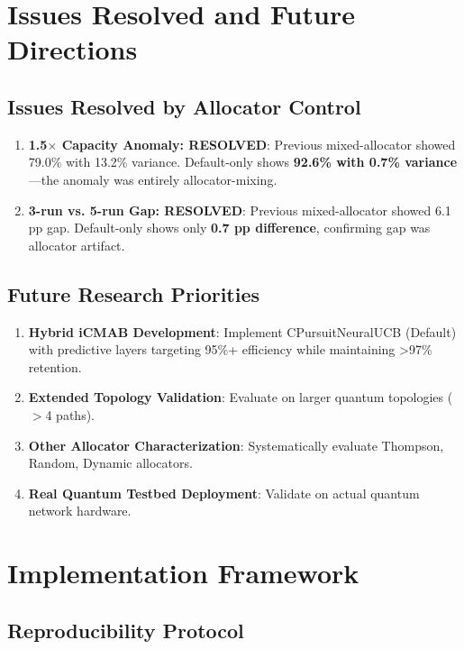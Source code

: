 \documentclass[12pt,a4paper]{article}
\newcommand{\success}[1]{\textcolor{accentgreen}{\textbf{#1}}}
\begin{document}
\section{Issues Resolved and Future Directions}

\subsection{Issues Resolved by Allocator Control}

\begin{enumerate}
    \item \success{1.5$\times$ Capacity Anomaly: RESOLVED}: Previous mixed-allocator showed 79.0\% with 13.2\% variance. Default-only shows \success{92.6\% with 0.7\% variance}—the anomaly was entirely allocator-mixing.
    
    \item \success{3-run vs. 5-run Gap: RESOLVED}: Previous mixed-allocator showed 6.1 pp gap. Default-only shows only \success{0.7 pp difference}, confirming gap was allocator artifact.
\end{enumerate}

\subsection{Future Research Priorities}

\begin{enumerate}
    \item \textbf{Hybrid iCMAB Development}: Implement CPursuitNeuralUCB (Default) with predictive layers targeting 95\%+ efficiency while maintaining >97\% retention.
    \item \textbf{Extended Topology Validation}: Evaluate on larger quantum topologies ($>$4 paths).
    \item \textbf{Other Allocator Characterization}: Systematically evaluate Thompson, Random, Dynamic allocators.
    \item \textbf{Real Quantum Testbed Deployment}: Validate on actual quantum network hardware.
\end{enumerate}

\section{Implementation Framework}

\subsection{Reproducibility Protocol}
\end{document}
